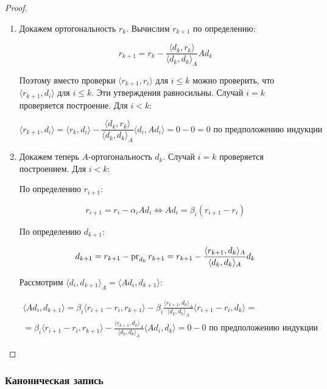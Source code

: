 \begin{proof}
\begin{itemize}
        \begin{enumerate}
            \item Докажем ортогональность $r_k$. Вычислим $r_{k+1}$ по определению:

            \[
            r_{k+1} = r_k - \frac{\langle d_k, r_k \rangle}{\langle d_k, d_k \rangle_A} A d_k
            \]

            Поэтому вместо проверки $\langle r_{k+1}, r_i \rangle$ для $i \leqslant k$ можно проверить, что $\langle r_{k+1}, d_i \rangle$ для $i \leqslant k$. Эти утверждения равносильны. Случай $i = k$ проверяется построение. Для $i < k$:

            \[
            \langle r_{k+1}, d_i \rangle = \langle r_k, d_i \rangle - \frac{\langle d_k, r_k \rangle}{\langle d_k, d_k \rangle_A} \langle d_i, A d_i \rangle = 0 - 0 = 0 \text{ по предположению индукции}
            \]

            \item Докажем теперь $A$-ортогональность $d_k$. Случай $i = k$ проверяется построением. Для $i < k$:

            По определению $r_{i+1}$:

            \[
            r_{i+1} = r_i - \alpha_i A d_i \iff A d_i = \beta_i (r_{i+1} - r_i)
            \]

            По определению $d_{k+1}$:

            \[
            d_{k+1} = r_{k+1} - \operatorname{pr}_{d_k} r_{k+1} = r_{k+1} - \frac{\langle r_{k+1}, d_k \rangle_A}{\langle d_k, d_k \rangle_A} d_k
            \]

            Рассмотрим $ \langle d_i, d_{k+1} \rangle_A = \langle A d_i, d_{k+1} \rangle$:

            \begin{multline*}
                \langle A d_i, d_{k+1} \rangle = \beta_i \langle r_{i+1} - r_i, r_{k+1} \rangle - \beta_i \frac{\langle r_{k+1}, d_k \rangle_A}{\langle d_k, d_k \rangle_A} \langle r_{i+1} - r_i, d_k \rangle = \\ = \beta_i \langle r_{i+1} - r_i, r_{k+1} \rangle - \frac{\langle r_{k+1}, d_k \rangle_A}{\langle d_k, d_k \rangle_A} \langle A d_i, d_k \rangle = 0 - 0 \text{ по предположению индукции}
            \end{multline*}
        \end{enumerate}
    \end{itemize}
\end{proof}

\subsubsection*{Каноническая запись}

